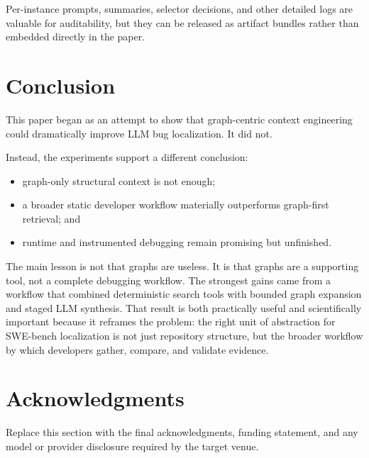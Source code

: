 \documentclass[11pt]{article}
\begin{document}
Per-instance prompts, summaries, selector decisions, and other detailed logs are valuable for auditability, but they can be released as artifact bundles rather than embedded directly in the paper.

\section{Conclusion}

This paper began as an attempt to show that graph-centric context engineering could dramatically improve LLM bug localization. It did not.

Instead, the experiments support a different conclusion:

\begin{itemize}
\item graph-only structural context is not enough;
\item a broader static developer workflow materially outperforms graph-first retrieval; and
\item runtime and instrumented debugging remain promising but unfinished.
\end{itemize}

The main lesson is not that graphs are useless. It is that graphs are a supporting tool, not a complete debugging workflow. The strongest gains came from a workflow that combined deterministic search tools with bounded graph expansion and staged LLM synthesis. That result is both practically useful and scientifically important because it reframes the problem: the right unit of abstraction for SWE-bench localization is not just repository structure, but the broader workflow by which developers gather, compare, and validate evidence.

\section*{Acknowledgments}

Replace this section with the final acknowledgments, funding statement, and any model or provider disclosure required by the target venue.



\end{document}
